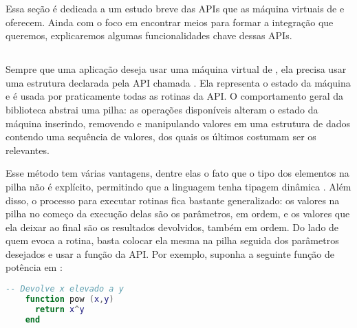     Essa seção é dedicada a um estudo breve das APIs que as máquina virtuais de
     e  oferecem. Ainda com o foco em encontrar meios
    para formar a integração que queremos, explicaremos algumas funcionalidades
    chave dessas APIs.

    \subsection{}

      Sempre que uma aplicação deseja usar uma máquina virtual de ,
      ela precisa usar uma estrutura declarada pela API chamada
      . Ela representa o estado da máquina e é usada por
      praticamente todas as rotinas da API. O comportamento geral da biblioteca
      abstrai uma pilha: as operações disponíveis alteram o estado da máquina
      inserindo, removendo e manipulando valores em uma estrutura de dados
      contendo uma sequência de valores, dos quais os últimos costumam ser os
      relevantes\footnotemark{}.


      Esse método tem várias vantagens, dentre elas o fato que o tipo dos
      elementos na pilha não é explícito, permitindo que a linguagem tenha
      tipagem dinâmica \cite{pl:00}. Além disso, o processo para executar
      rotinas fica bastante generalizado: os valores na pilha no começo da
      execução delas são os parâmetros, em ordem, e os valores que ela deixar ao
      final são os resultados devolvidos, também em ordem. Do lado de quem evoca
      a rotina, basta colocar ela mesma na pilha seguida dos parâmetros
      desejados e usar a função  da API. Por exemplo, suponha
      a seguinte função de potência em :
      
      \vspace{1em}

    \begin{lstlisting}[language=lua]
    -- Devolve x elevado a y
    function pow (x,y)
      return x^y
    end
    \end{lstlisting}
      
      \vspace{1em}


